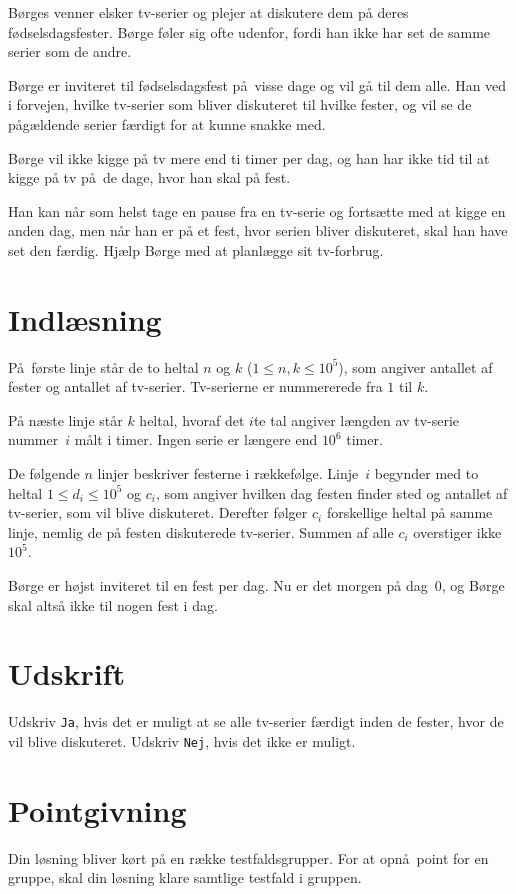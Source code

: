 Børges venner elsker tv-serier og plejer at diskutere dem på deres fødselsdagsfester.
Børge føler sig ofte udenfor, fordi han ikke har set de samme serier som de andre.

Børge er inviteret til fødselsdagsfest på visse dage og vil gå til dem alle.
Han ved i forvejen, hvilke tv-serier som bliver diskuteret til hvilke fester, og vil se de pågældende serier færdigt for at kunne snakke med.

Børge vil ikke kigge på tv mere end ti timer per dag, og han har ikke tid til at kigge på tv på de dage, hvor han skal på fest.

Han kan når som helst tage en pause fra en tv-serie og fortsætte med at kigge en anden dag, men når han er på et fest, hvor serien bliver diskuteret, skal han have set den færdig.
Hjælp Børge med at planlægge sit tv-forbrug.

\section*{Indlæsning}
På første linje står de to heltal $n$ og $k$ ($1 \leq n,k \leq 10^5$), som angiver antallet af fester og antallet af tv-serier.
Tv-serierne er nummererede fra $1$ til $k$.

På næste linje står $k$ heltal, hvoraf det $i$te tal angiver længden av tv-serie nummer~$i$ målt i timer.
Ingen serie er længere end $10^6$ timer.

De følgende $n$ linjer beskriver festerne i rækkefølge.
Linje~$i$ begynder med to heltal $1 \leq d_i \leq 10^5$ og $c_i$, som angiver hvilken dag festen finder sted og antallet af tv-serier, som vil blive diskuteret.
Derefter følger $c_i$ forskellige heltal på samme linje, nemlig de på festen diskuterede tv-serier.
Summen af alle $c_i$ overstiger ikke $10^5$.

Børge er højst inviteret til en fest per dag. 
Nu er det morgen på dag~$0$,  og Børge skal altså ikke til nogen fest i dag.

\section*{Udskrift}
Udskriv \texttt{Ja}, hvis det er muligt at se alle tv-serier færdigt inden de fester, hvor de vil blive diskuteret.
Udskriv \texttt{Nej}, hvis det ikke er muligt.

\section*{Pointgivning}
Din løsning bliver kørt på en række testfaldsgrupper.
For at opnå point for en gruppe, skal din løsning klare samtlige testfald i gruppen.

